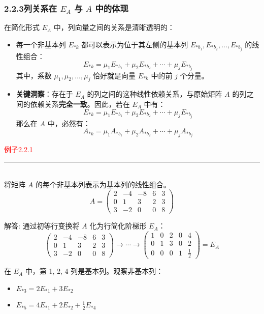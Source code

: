 \subsubsection*{2.2.3列关系在 \( E_A \) 与 \( A \) 中的体现}

在简化形式 \( E_A \) 中，列向量之间的关系是清晰透明的：
\begin{itemize}
    \item 每一个非基本列 \( E_{*k} \) 都可以表示为位于其左侧的基本列 \( E_{*b_1}, E_{*b_2}, \dots, E_{*b_j} \) 的线性组合：
    \[
    E_{*k} = \mu_1 E_{*b_1} + \mu_2 E_{*b_2} + \cdots + \mu_j E_{*b_j}
    \]
    其中，系数 \( \mu_1, \mu_2, \dots, \mu_j \) 恰好就是向量 \( E_{*k} \) 中的前 \( j \) 个分量。
    
    \item \textbf{关键洞察}：存在于 \( E_A \) 的列之间的这种线性依赖关系，与原始矩阵 \( A \) 的列之间的依赖关系\textbf{完全一致}。因此，若在 \( E_A \) 中有：
    \[
    E_{*k} = \mu_1 E_{*b_1} + \mu_2 E_{*b_2} + \cdots + \mu_j E_{*b_j}
    \]
    那么在 \( A \) 中，必然有：
    \[
    A_{*k} = \mu_1 A_{*b_1} + \mu_2 A_{*b_2} + \cdots + \mu_j A_{*b_j}
    \]
\end{itemize}

\textcolor{red}{例子2.2.1}
\color{red}\rule{\textwidth}{0.4pt}\color{black}\\
将矩阵 \( A \) 的每个非基本列表示为基本列的线性组合。
\[
A = \begin{pmatrix}
2 & -4 & -8 & 6 & 3 \\
0 & 1 & 3 & 2 & 3 \\
3 & -2 & 0 & 0 & 8
\end{pmatrix}
\]

解答:
通过初等行变换将 \( A \) 化为行简化阶梯形 \( E_A \)：
\[
\begin{pmatrix}
2 & -4 & -8 & 6 & 3 \\
0 & 1 & 3 & 2 & 3 \\
3 & -2 & 0 & 0 & 8
\end{pmatrix}
\rightarrow \cdots \rightarrow
\begin{pmatrix}
1 & 0 & 2 & 0 & 4 \\
0 & 1 & 3 & 0 & 2 \\
0 & 0 & 0 & 1 & \frac{1}{2}
\end{pmatrix} = E_A
\]

在 \( E_A \) 中，第 1, 2, 4 列是基本列。观察非基本列：
\begin{itemize}
    \item \( E_{*3} = 2E_{*1} + 3E_{*2} \)
    \item \( E_{*5} = 4E_{*1} + 2E_{*2} + \frac{1}{2}E_{*4} \)
\end{itemize}

